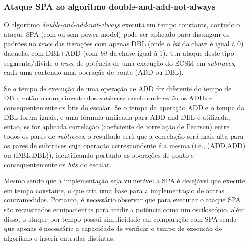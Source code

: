 \subsubsection{Ataque SPA ao algoritmo double-and-add-not-always}
O algoritmo \textit{double-and-add-not-always} executa em tempo constante, contudo o ataque SPA (com ou sem power model) pode ser aplicado para distinguir os padrões no \textit{trace} das iterações com apenas DBL (onde o \textit{bit} da chave é igual à $0$) daquelas com DBL+ADD (com \textit{bit} da chave igual à $1$). Um ataque deste tipo segmenta/divide o \textit{trace} de potência de uma execução do ECSM em \textit{subtraces}, cada uma contendo uma operação de ponto (ADD ou DBL). 

Se o tempo de execução de uma operação de ADD for diferente do tempo de DBL, então o comprimento dos \textit{subtraces} revela onde estão os ADDs e consequentemente os bits do escalar. Se o tempo da operação ADD e o tempo da DBL forem iguais, e uma fórmula unificada para ADD and DBL é utilizada, então, se for aplicada correlação (coeficiente de correlação de Pearson) entre todos os pares de \textit{subtraces}, o resultado será que a correlação será mais alta para os pares de subtraces cuja operação correspondente é a mesma (i.e., (ADD,ADD) ou (DBL,DBL)), identificando portanto as operações de ponto e consequentemente os \textit{bits} do escalar.

Mesmo sendo que a implementação seja vulnerável a SPA é desejável que execute em tempo constante, o que cria uma base para a implementação de outras contramedidas. Portanto, é necessário observar que para executar o ataque SPA são requisitados equipamentos para medir a potência como um osciloscópio, além disso, o ataque por tempo possui simplicidade em comparação com SPA sendo que apenas é necessária a capacidade de verificar o tempo de execução do algoritmo e inserir entradas distintas.

\begin{comment}
\erick[inline]{Lucas: ver o comentario no fonte. Converter comentario em texto}.

b.	Se é de tempo constante, SPA (com ou sem power model) pode ser aplicado para distinguir os padrões no trace das iterações com apenas DBL (bit=0) daquelas com DBL+ADD (bit=1). Um ataque deste tipo segmenta/divide o trace de potencia de uma execucao do ECSM em subtraces, cada um contendo uma operacao de ponto (ADD ou DBL). Se as tempo(ADD) != tempo(DBL), então o comprimento dos subtraces revela onde estão os ADDs e consequentemente os bits do escalar. Se tempo(ADD) == tempo(DBL) e uma formula unificada para ADD and DBL é utilizada, então, se for aplicada correlação (coeficiente de correlacao de Pearson) entre todos os pares de subtraces, o resultado será que a correlação será mais alta para os pares de subtraces cuja operação correspondente é a mesma (i.e., (ADD,ADD) ou (DBL,DBL)), identificando portanto as operações de ponto e consequentemente os bits do escalar.
\end{comment}

